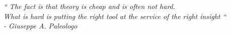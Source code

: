 \begin{epigrafe}
\vspace*{\fill}
\begin{flushright}
\textit{``
The fact is that theory is cheap and is often not hard. \\
What is hard is putting the right tool at the service of the right insight `` \\
- Giuseppe A. Paleologo
}
\end{flushright}
\end{epigrafe}